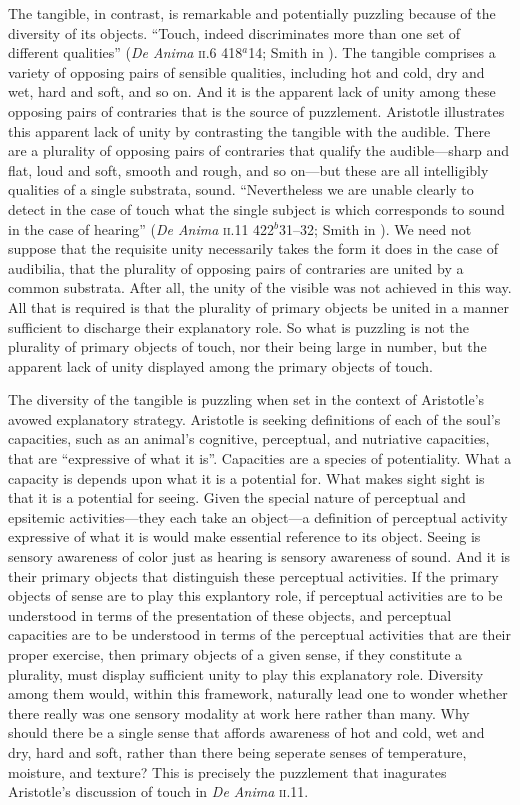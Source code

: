 The tangible, in contrast, is remarkable and potentially puzzling because of the diversity of its objects. ``Touch, indeed discriminates more than one set of different qualities'' (\emph{De Anima} \textsc{ii}.6 418\( ^{a} \)14; Smith in \citealt[32]{Barnes:1984uq}). The tangible comprises a variety of opposing pairs of sensible qualities, including hot and cold, dry and wet, hard and soft, and so on. And it is the apparent lack of unity among these opposing pairs of contraries that is the source of puzzlement. Aristotle illustrates this apparent lack of unity by contrasting the tangible with the audible. There are a plurality of opposing pairs of contraries that qualify the audible---sharp and flat, loud and soft, smooth and rough, and so on---but these are all intelligibly qualities of a single substrata, sound. ``Nevertheless we are unable clearly to detect in the case of touch what the single subject is which corresponds to sound in the case of hearing'' (\emph{De Anima} \textsc{ii}.11 422\( ^{b} \)31--32; Smith in \citealt[40]{Barnes:1984uq}). We need not suppose that the requisite unity necessarily takes the form it does in the case of audibilia, that the plurality of opposing pairs of contraries are united by a common substrata. After all, the unity of the visible was not achieved in this way. All that is required is that the plurality of primary objects be united in a manner sufficient to discharge their explanatory role. So what is puzzling is not the plurality of primary objects of touch, nor their being large in number, but the apparent lack of unity displayed among the primary objects of touch.

The diversity of the tangible is puzzling when set in the context of Aristotle's avowed explanatory strategy. Aristotle is seeking definitions of each of the soul's capacities, such as an animal's cognitive, perceptual, and nutriative capacities, that are ``expressive of what it is''. Capacities are a species of potentiality. What a capacity is depends upon what it is a potential for. What makes sight sight is that it is a potential for seeing. Given the special nature of perceptual and epsitemic activities---they each take an object---a definition of perceptual activity expressive of what it is would make essential reference to its object. Seeing is sensory awareness of color just as hearing is sensory awareness of sound. And it is their primary objects that distinguish these perceptual activities. If the primary objects of sense are to play this explantory role, if perceptual activities are to be understood in terms of the presentation of these objects, and perceptual capacities are to be understood in terms of the perceptual activities that are their proper exercise, then primary objects of a given sense, if they constitute a plurality, must display sufficient unity to play this explanatory role. Diversity among them would, within this framework, naturally lead one to wonder whether there really was one sensory modality at work here rather than many. Why should there be a single sense that affords awareness of hot and cold, wet and dry, hard and soft, rather than there being seperate senses of temperature, moisture, and texture? This is precisely the puzzlement that inagurates Aristotle's discussion of touch in \emph{De Anima} \textsc{ii}.11.


